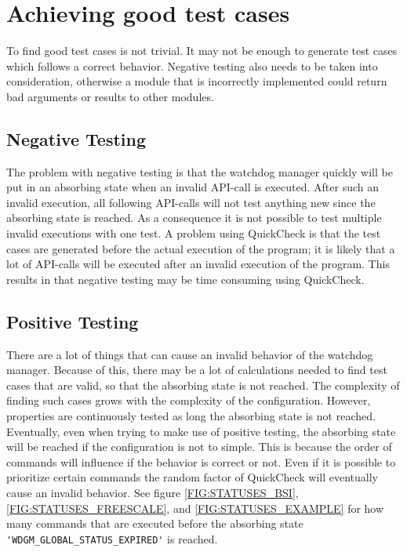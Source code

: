 
\section{Achieving good test cases}
To find good test cases is not trivial. It may not be enough to
generate test cases which follows a correct behavior. Negative testing
also needs to be taken into consideration, otherwise a module that is
incorrectly implemented could return bad arguments or results to other
modules.

\subsection{Negative Testing}
The problem with negative testing is that the watchdog manager quickly
will be put in an absorbing state when an invalid API-call is
executed. After such an invalid execution, all following API-calls
will not test anything new since the absorbing state is reached. As a
consequence it is not possible to test multiple invalid executions
with one test. A problem using QuickCheck is that the test cases are
generated before the actual execution of the program; it is likely
that a lot of API-calls will be executed after an invalid execution of
the program. This results in that negative testing may be time
consuming using QuickCheck.

\subsection{Positive Testing}
There are a lot of things that can cause an invalid behavior of the
watchdog manager. Because of this, there may be a lot of calculations
needed to find test cases that are valid, so that the absorbing state
is not reached. The complexity of finding such cases grows with the
complexity of the configuration. However, properties are continuously
tested as long the absorbing state is not reached. Eventually, even
when trying to make use of positive testing, the absorbing state will
be reached if the configuration is not to simple. This is because the
order of commands will influence if the behavior is correct or
not. Even if it is possible to prioritize certain commands the random
factor of QuickCheck will eventually cause an invalid behavior. See
figure \ref{FIG:STATUSES_BSI}, \ref{FIG:STATUSES_FREESCALE}, and
\ref{FIG:STATUSES_EXAMPLE} for how many commands that are executed
before the absorbing state \lstinline!'WDGM_GLOBAL_STATUS_EXPIRED'! is
reached.

